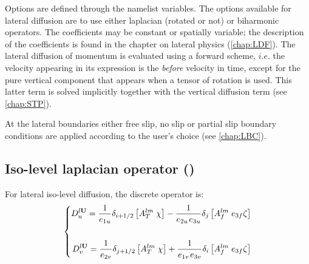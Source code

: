 \documentclass[../tex_main/NEMO_manual]{subfiles}
\begin{document}
Options are defined through the  namelist variables.
The options available for lateral diffusion are to use either laplacian (rotated or not) or biharmonic operators.
The coefficients may be constant or spatially variable;
the description of the coefficients is found in the chapter on lateral physics (\autoref{chap:LDF}).
The lateral diffusion of momentum is evaluated using a forward scheme,
$i.e.$ the velocity appearing in its expression is the \textit{before} velocity in time,
except for the pure vertical component that appears when a tensor of rotation is used.
This latter term is solved implicitly together with the vertical diffusion term (see \autoref{chap:STP}).

At the lateral boundaries either free slip,
no slip or partial slip boundary conditions are applied according to the user's choice (see \autoref{chap:LBC}).


\subsection[Iso-level laplacian (\protect\np{ln\_dynldf\_lap}\forcode{ = .true.})]
				{Iso-level laplacian operator (\protect{})}
\label{subsec:DYN_ldf_lap}

For lateral iso-level diffusion, the discrete operator is: 
\begin{equation} \label{eq:dynldf_lap}
\left\{ \begin{aligned}
 D_u^{l{\rm {\bf U}}} =\frac{1}{e_{1u} }\delta _{i+1/2} \left[ {A_T^{lm} 
\;\chi } \right]-\frac{1}{e_{2u} {\kern 1pt}e_{3u} }\delta _j \left[ 
{A_f^{lm} \;e_{3f} \zeta } \right] \\ 
\\
 D_v^{l{\rm {\bf U}}} =\frac{1}{e_{2v} }\delta _{j+1/2} \left[ {A_T^{lm} 
\;\chi } \right]+\frac{1}{e_{1v} {\kern 1pt}e_{3v} }\delta _i \left[ 
{A_f^{lm} \;e_{3f} \zeta } \right] \\ 
\end{aligned} \right.
\end{equation} 
\end{document}
